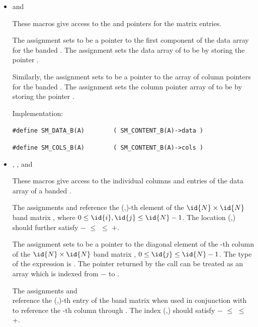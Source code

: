 \begin{itemize}
\item {} and 
                                                            
  These macros give access to the  and  pointers for
  the matrix entries.

  The assignment  sets  to be     
  a pointer to the first component of the data array for the
  banded  .  The assignment  sets the data array of  to be  by storing
  the pointer . 
  
  Similarly, the assignment  sets  to be     
  a pointer to the array of column pointers for the banded  . 
  The assignment  sets the column pointer
  array of  to be  by storing the pointer .                   
  
  Implementation:

  \verb|#define SM_DATA_B(A)        ( SM_CONTENT_B(A)->data )|

  \verb|#define SM_COLS_B(A)        ( SM_CONTENT_B(A)->cols )|


\item {}, , and 
                                                            
  These macros give access to the individual columns and entries of
  the data array of a banded .

  The assignments  and  reference the (,)-th element of the
  $\id{N} \times \id{N}$ band matrix , where $0 \le \id{i}, \id{j} \le \id{N}-1$.
  The location (,) should further satisfy
  $-$ $\le$  $\le$ $+$.

  The assignment  sets  to be
  a pointer to the diagonal element of the -th column of the
  $\id{N} \times \id{N}$ band matrix , $0 \le \id{j} \le \id{N}-1$. 
  The type of the expression  is . 
  The pointer returned by the call  can be treated as 
  an array which is indexed from $-$ to .

  The assignments  and\\
   reference the
  (,)-th entry of the band matrix  when used in
  conjunction with  to reference the -th column
  through . The index (,) should satisfy 
  $-$ $\le$  $\le$ $+$.


\end{itemize}
